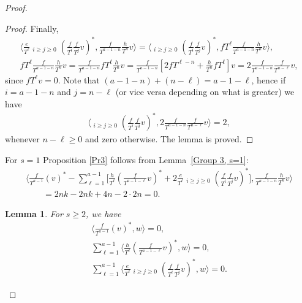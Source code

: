 \documentclass[pdftex]{sigma}
\numberwithin{equation}{section}
\newtheorem{lem}[thm]{Lemma}
\begin{document}
\begin{proof}
\begin{proof}
Finally,
\begin{gather*}
\bigg\langle \frac{e}{T^{\ell}} \mathop{\sum_{i+j=a-1-\ell}}_{i\geq j\geq 0} \left(\frac{f}{T^i}\frac{f}{T^j}v\right)^*, \frac{f}{T^{a-1-n}}\frac{h}{T^n} v \bigg\rangle = \bigg\langle \mathop{\sum_{i+j=a-1-\ell}}_{i\geq j\geq 0} \left(\frac{f}{T^i}\frac{f}{T^j}v\right)^*, fT^{\ell} \frac{f}{T^{a-1-n}}\frac{h}{T^n} v \bigg\rangle, \\
fT^{\ell} \frac{f}{T^{a-1-n}}\frac{h}{T^n} v = \frac{f}{T^{a-1-n}} fT^{\ell} \frac{h}{T^n} v = \frac{f}{T^{a-1-n}} \left[ 2fT^{\ell-n} + \frac{h}{T^n} fT^{\ell} \right] v = 2 \frac{f}{T^{a-1-n}} \frac{f}{T^{n-\ell}} v,
\end{gather*}
since $ fT^{\ell} v = 0$. Note that $(a-1-n)+(n-\ell)=a-1-\ell$, hence if $i = a-1-n$ and $j = n-\ell$ (or vice versa depending on what is greater) we have
\begin{gather*}
\bigg\langle \mathop{\sum_{i+j=a-1-\ell}}_{i\geq j\geq 0} \left(\frac{f}{T^i}\frac{f}{T^j}v\right)^*, 2 \frac{f}{T^{a-1-n}} \frac{f}{T^{n-\ell}} v \bigg\rangle = 2,
\end{gather*}
whenever $n-\ell \geq 0$ and zero otherwise. The lemma is proved.
\end{proof}

For $s=1$ Proposition \ref{Pr3} follows from Lemma~\ref{Group 3, s=1}:
\begin{gather*}
\bigg\langle \frac{f}{T^{a-1}} (v)^* - \sum_{\ell=1}^{a-1} \bigg[\frac{h}{T^{\ell}}\left(\frac{f}{T^{a-1-\ell}}v\right)^* + 2\frac{e}{T^{\ell}} \mathop{\sum_{i+j=a-1-\ell}}_{i\geq j\geq 0} \left(\frac{f}{T^i}\frac{f}{T^j}v\right)^*\bigg], \frac{f}{T^{a-1-n}}\frac{h}{T^n} v \bigg\rangle \\
\qquad = 2nk - 2nk + 4n - 2 \cdot 2n = 0.
\end{gather*}

\begin{lem}\label{lem G1s}
For $s \geq 2$, we have
\begin{gather}
\bigg\langle \frac{f}{T^{a-1}}(v) ^*, w \bigg\rangle =0, \label{G1sg1} \\
\sum_{\ell=1}^{a-1} \bigg\langle \frac{h}{T^{\ell}} \left(\frac{f}{T^{a-1-\ell}}v\right)^*, w \bigg\rangle =0, \label{G1sg2} \\
\sum_{\ell=1}^{a-1} \bigg\langle \frac{e}{T^{\ell}} \mathop{\sum_{i+j=a-1-\ell}}_{i\geq j\geq 0} \left(\frac{f}{T^i}\frac{f}{T^j}v\right)^*, w \bigg\rangle = 0. \label{G1sg3}
\end{gather}
\end{lem}


\end{proof}
\end{document}

